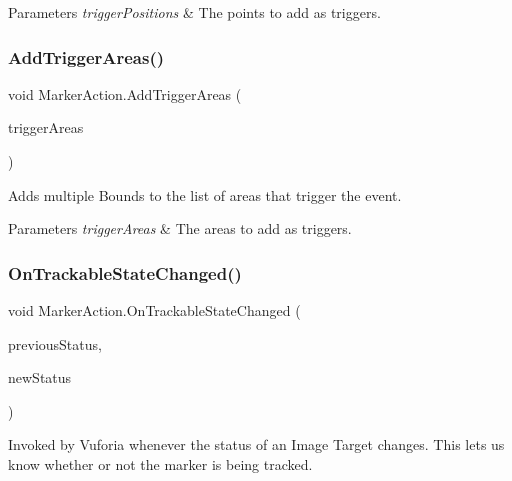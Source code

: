 \begin{DoxyParams}{Parameters}
{\em trigger\+Positions} & The points to add as triggers.\\
\hline
\end{DoxyParams}
\mbox{\label{class_marker_action_aaec6622e06d2c62418117d1d4a4c1d70}} 
\subsubsection{\texorpdfstring{AddTriggerAreas()}{AddTriggerAreas()}\hspace{0.1cm}{\footnotesize\ttfamily [2/2]}}
{\footnotesize\ttfamily void Marker\+Action.\+Add\+Trigger\+Areas (\begin{DoxyParamCaption}\item[{I\+Enumerable$<$ Bounds $>$}]{trigger\+Areas }\end{DoxyParamCaption})}



Adds multiple Bounds to the list of areas that trigger the event. 


\begin{DoxyParams}{Parameters}
{\em trigger\+Areas} & The areas to add as triggers.\\
\hline
\end{DoxyParams}
\mbox{\label{class_marker_action_a28c986679a514fd744617cf0916e7662}} 
\subsubsection{\texorpdfstring{OnTrackableStateChanged()}{OnTrackableStateChanged()}}
{\footnotesize\ttfamily void Marker\+Action.\+On\+Trackable\+State\+Changed (\begin{DoxyParamCaption}\item[{Trackable\+Behaviour.\+Status}]{previous\+Status,  }\item[{Trackable\+Behaviour.\+Status}]{new\+Status }\end{DoxyParamCaption})}



Invoked by Vuforia whenever the status of an Image Target changes. This lets us know whether or not the marker is being tracked. 


